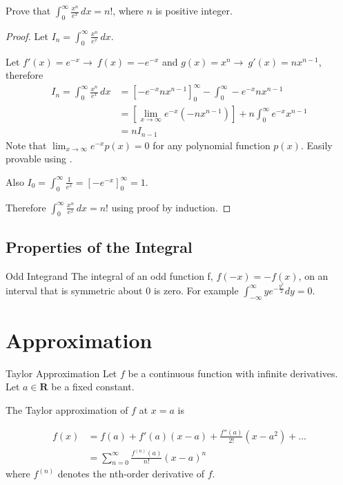 \documentclass[11pt,a4paper,fleqn]{article}
\numberwithin{equation}{section}
\newcommand{\g}{$\rightarrow\ $}
\begin{document}
\begin{exec}
    Prove that $\int_{0}^{\infty}\frac{x^n}{e^{x}}\,dx = n!$, where $n$ is positive integer.
    \tcblower
    \begin{proof}
        Let $I_n = \int_{0}^{\infty}\frac{x^n}{e^{x}}\,dx$.

        Let $f'(x)=e^{-x}$\g$f(x)=-e^{-x}$ and $g(x)=x^n$\g$g'(x)=nx^{n-1}$, therefore
        \begin{align*}
            I_n = \int_{0}^{\infty}\frac{x^n}{e^{x}}\,dx
            &= \left[-e^{-x}nx^{n-1}\right]^{\infty}_{0} - \int_{0}^{\infty}-e^{-x}nx^{n-1} \\
            &= \left[\lim_{x\rightarrow\infty}e^{-x}(-nx^{n-1})\right] + n\int_{0}^{\infty}e^{-x}x^{n-1} \\
            &= nI_{n-1}
        \end{align*}
        Note that $\lim_{x\rightarrow\infty}e^{-x}p(x)=0$ for any polynomial function $p(x)$. Easily provable using .

        Also $I_{0}=\int^{\infty}_{0}\frac{1}{e^x}=\left[-e^{-x}\right]^{\infty}_{0}=1$.

        Therefore $\int_{0}^{\infty}\frac{x^n}{e^{x}}\,dx=n!$ using proof by induction.
    \end{proof}
\end{exec}

\subsection{Properties of the Integral}

\begin{fact}{Odd Integrand}{}
    The integral of an odd function f, $f(-x)=-f(x)$, on an interval that is symmetric about 0 is zero. For example $\int_{-\infty}^{\infty} ye^{-\frac{y^2}{2}}dy=0$.
\end{fact}

\section{Approximation}
\begin{fact}{Taylor Approximation}{}
    Let $f$ be a continuous function with infinite derivatives.
    Let $a\in \textbf{R}$ be a fixed constant.

    The Taylor approximation of $f$ at $x=a$ is

    \begin{align}
        f(x) &= f(a) + f'(a)(x-a) + \frac{f''(a)}{2!}(x-a^2)+...\\
        &= \sum^{\infty}_{n=0}\frac{f^{(n)}(a)}{n!}(x-a)^n
    \end{align}
    where $f^{(n)}$ denotes the nth-order derivative of $f$.
\end{fact}
\end{document}
